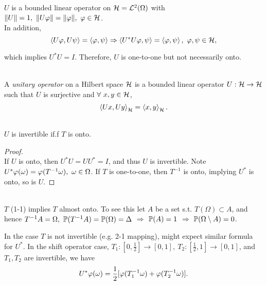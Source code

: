 \np $U$ is a bounded linear operator on $\Hs = \Ls^2(\Omega)$ with $\norm{U} = 1,\ \norm{U\vphi} = \norm{\vphi},\ \vphi \in \Hs$.\\
In addition,
\begin{equation*}
    \inprod{U \vphi}{U \psi} = \inprod{\vphi}{\psi} \Rightarrow \inprod{U^* U \vphi}{\psi} = \inprod{\vphi}{\psi},\ \vphi,\psi \in \Hs,
\end{equation*}

\np which implies $U^*U = I$. Therefore, $U$ is one-to-one but not necessarily onto.

\begin{definition}\ \\
A \textit{unitary operator} on a Hilbert space $\Hs$ is a bounded linear operator $U: \Hs \to \Hs$ such that $U$ is surjective and $\forall\ x,y \in \Hs$,
\begin{equation*}
    \inprod{Ux}{Uy}_{\Hs} = \inprod{x}{y}_{\Hs}.
\end{equation*}

\end{definition}
\begin{remark}\ \\
$U$ is invertible if.f $T$ is onto.
\begin{proof}\ \\
If $U$ is onto, then $U^* U = U U^* = I$, and thus $U$ is invertible. Note $U^* \vphi(\omega) = \vphi(T^{-1} \omega),\ \omega \in \Omega$. If $T$ is one-to-one, then $T^{-1}$ is onto, implying $U^*$ is onto, so is $U$.
\end{proof}
\end{remark}

\begin{remark}\ \\
$T$ (1-1) implies $T$ almost onto. To see this let $A$ be a set s.t. $T(\Omega) \subset A$, and hence $T^{-1} A = \Omega,\ \P(T^{-1}A) = \P(\Omega) = \Delta$ $\Rightarrow$ $\P(A) = 1$ $\Rightarrow$ $\P(\Omega \setminus A) = 0$. 
\end{remark}

\np In the case $T$ is not invertible (e.g. 2-1 mapping), might expect similar formula for $U^*$. In the shift operator case, $T_1:[0,\frac{1}{2}] \to [0,1],\ T_2: [\frac{1}{2},1] \to [0,1]$, and $T_1, T_2$ are invertible, we have
\begin{equation*}
    U^* \vphi(\omega) = \frac{1}{2}[\vphi(T_1^{-1} \omega) + \vphi(T_2^{-1} \omega)].
\end{equation*}

